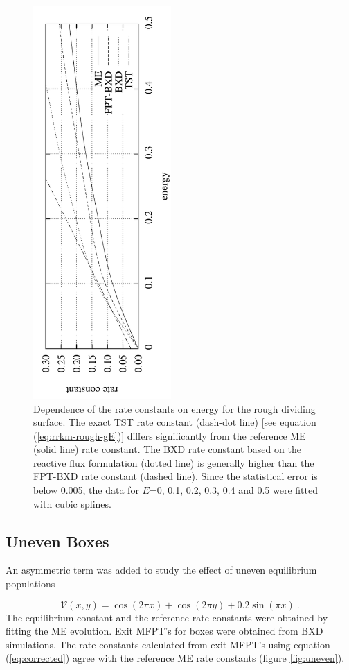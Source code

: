 \begin{figure}[h!]
\centering
\includegraphics[height=15cm, angle=270]{Images/rough.pdf}
\caption[FPT-BXD results for a rough dividing surface.]{Dependence of the rate constants on energy for the rough dividing surface. The exact TST rate constant (dash-dot line) [see equation (\ref{eq:rrkm-rough-gE})] differs significantly from the reference ME (solid line) rate constant. The BXD rate constant based on the reactive flux formulation (dotted line) is generally higher than the FPT-BXD rate constant (dashed line). Since the statistical error is below 0.005, the data for $E$=0, 0.1, 0.2, 0.3, 0.4 and 0.5 were fitted with cubic splines. }
\label{fig:mfpt-rough}
\end{figure}

\subsection{Uneven Boxes}

An asymmetric term was added to study the effect of uneven equilibrium populations

\begin{equation}
\label{eq:toy-pel-uneven}
\mathscr{V}(x,y) = \cos (2 \pi x) + \cos (2 \pi y) + 0.2 \sin (\pi x) ~.
\end{equation}
The equilibrium constant and the reference rate constants were obtained by fitting the ME evolution.
Exit MFPT's for boxes were obtained from BXD simulations.
The rate constants calculated from exit MFPT's using equation (\ref{eq:corrected}) agree with the reference ME rate constants (figure \ref{fig:uneven}).


